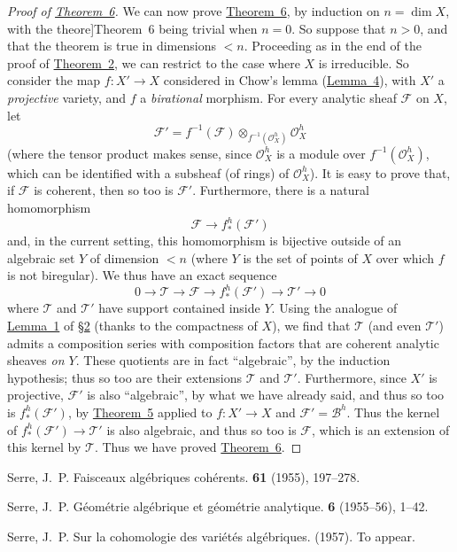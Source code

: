 \documentclass{article}
\newcommand{\scr}[1]{{\mathscr{#1}}}
\newcommand{\oldpage}[1]{\marginpar{\footnotesize$\Big\vert$ \textit{p.~#1}}}
\begin{document}
\begin{proof}[Proof of {\hyperref[theorem6]{Theorem~6}}]
  We can now prove \hyperref[theorem6]{Theorem~6}, by induction on $n=\dim X$, with the theore]{Theorem~6} being trivial when $n=0$.
  So suppose that $n>0$, and that the theorem is true in dimensions $<n$.
  Proceeding as in the end of the proof of \hyperref[theorem2]{Theorem~2}, we can restrict to the case where $X$ is irreducible.
  So consider the map $f\colon X'\to X$ considered in Chow's lemma (\hyperref[lemma4]{Lemma~4}), with $X'$ a \emph{projective} variety, and $f$ a \emph{birational} morphism.
  For every analytic sheaf $\scr{F}$ on $X$, let
  \[
    \scr{F}' = f^{-1}(\scr{F})\otimes_{f^{-1}(\scr{O}_X^h)}\scr{O}_X^h
  \]
  (where the tensor product makes sense, since $\scr{O}_X^h$ is a module over $f^{-1}(\scr{O}_X^h)$, which can be identified with a subsheaf (of rings) of $\scr{O}_X^h$).
  It is easy to prove that, if $\scr{F}$ is coherent, then so too is $\scr{F}'$.
  Furthermore, there is a natural homomorphism
  \oldpage{2-16}
  \[
    \scr{F} \to f_*^h(\scr{F}')
  \]
  and, in the current setting, this homomorphism is bijective outside of an algebraic set $Y$ of dimension $<n$ (where $Y$ is the set of points of $X$ over which $f$ is not biregular).
  We thus have an exact sequence
  \[
    0 \to \scr{T} \to \scr{F} \to f_*^h(\scr{F}') \to \scr{T}' \to 0
  \]
  where $\scr{T}$ and $\scr{T'}$ have support contained inside $Y$.
  Using the analogue of \hyperref[lemma1]{Lemma~1} of \hyperref[section2]{\S2} (thanks to the compactness of $X$), we find that $\scr{T}$ (and even $\scr{T}'$) admits a composition series with composition factors that are coherent analytic sheaves \emph{on $Y$}.
  These quotients are in fact ``algebraic'', by the induction hypothesis;
  thus so too are their extensions $\scr{T}$ and $\scr{T}'$.
  Furthermore, since $X'$ is projective, $\scr{F}'$ is also ``algebraic'', by what we have already said, and thus so too is $f_*^h(\scr{F}')$, by \hyperref[theorem5]{Theorem~5} applied to $f\colon X'\to X$ and $\scr{F}'=\scr{B}^h$.
  Thus the kernel of $f_*^h(\scr{F}')\to\scr{T}'$ is also algebraic, and thus so too is $\scr{F}$, which is an extension of this kernel by $\scr{T}$.
  Thus we have proved \hyperref[theorem6]{Theorem~6}.
\end{proof}



\nocite{*}

\begin{thebibliography}{3}

  {Serre, J.~P.}
  \newblock Faisceaux alg\'{e}briques coh\'{e}rents.
   \textbf{61} (1955), 197--278.

  {Serre, J.~P.}
  \newblock G\'{e}om\'{e}trie alg\'{e}brique et g\'{e}om\'{e}trie analytique.
   \textbf{6} (1955--56), 1--42.

  {Serre, J.~P.}
  \newblock Sur la cohomologie des vari\'{e}t\'{e}s alg\'{e}briques.
   (1957).
  \newblock To appear.

\end{thebibliography}
\end{document}
